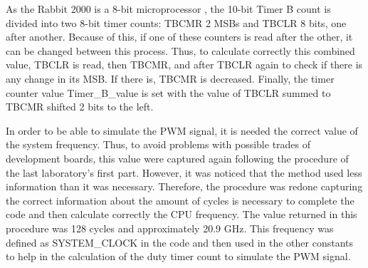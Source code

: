 As the Rabbit 2000 is a 8-bit microprocessor \cite{Digi_International_2007}, the 10-bit Timer B count is divided into two 8-bit timer counts: TBCMR 2 MSBs and TBCLR 8 bits, one after another. Because of this, if one of these counters is read after the other, it can be changed between this process. Thus, to calculate correctly this combined value, TBCLR is read, then TBCMR, and after TBCLR again to check if there is any change in its MSB. If there is, TBCMR is decreased. Finally, the timer counter value Timer_B_value is set with the value of TBCLR summed to TBCMR shifted 2 bits to the left. 

In order to be able to simulate the PWM signal, it is needed the correct value of the system frequency. Thus, to avoid problems with possible trades of development boards, this value were captured again following the procedure of the last laboratory's first part. However, it was noticed that the method used less information than it was necessary. Therefore, the procedure was redone capturing the correct information about the amount of cycles is necessary to complete the code and then calculate correctly the CPU frequency. The value returned in this procedure was 128 cycles and approximately 20.9 GHz. This frequency was defined as SYSTEM_CLOCK in the code and then used in the other constants to help in the calculation of the duty timer count to simulate the PWM signal.